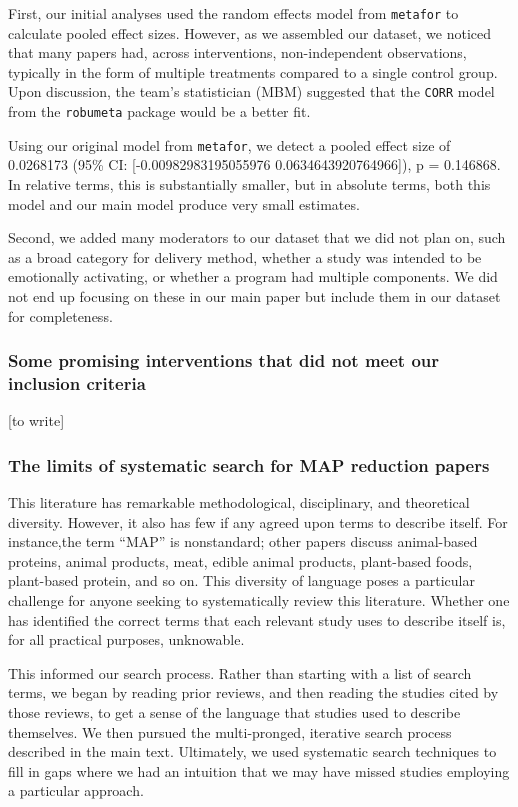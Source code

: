 \documentclass[sn-nature,referee,pdflatex]{sn-jnl}
\begin{document}
First, our initial analyses used the random effects model from
\texttt{metafor} to calculate pooled effect sizes. However, as we
assembled our dataset, we noticed that many papers had, across
interventions, non-independent observations, typically in the form of
multiple treatments compared to a single control group. Upon discussion,
the team's statistician (MBM) suggested that the \texttt{CORR} model
from the \texttt{robumeta} package would be a better fit.

Using our original model from \texttt{metafor}, we detect a pooled
effect size of 0.0268173 (95\% CI: {[}-0.00982983195055976
0.0634643920764966{]}), p = 0.146868. In relative terms, this is
substantially smaller, but in absolute terms, both this model and our
main model produce very small estimates.

Second, we added many moderators to our dataset that we did not plan on,
such as a broad category for delivery method, whether a study was
intended to be emotionally activating, or whether a program had multiple
components. We did not end up focusing on these in our main paper but
include them in our dataset for completeness.

\subsubsection{Some promising interventions that did not meet our
inclusion
criteria}\label{some-promising-interventions-that-did-not-meet-our-inclusion-criteria}

{[}to write{]}

\subsubsection{The limits of systematic search for MAP reduction
papers}\label{sec5.4.1}

This literature has remarkable methodological, disciplinary, and
theoretical diversity. However, it also has few if any agreed upon terms
to describe itself. For instance,the term ``MAP'' is nonstandard; other
papers discuss animal-based proteins, animal products, meat, edible
animal products, plant-based foods, plant-based protein, and so on. This
diversity of language poses a particular challenge for anyone seeking to
systematically review this literature. Whether one has identified the
correct terms that each relevant study uses to describe itself is, for
all practical purposes, unknowable.

This informed our search process. Rather than starting with a list of
search terms, we began by reading prior reviews, and then reading the
studies cited by those reviews, to get a sense of the language that
studies used to describe themselves. We then pursued the multi-pronged,
iterative search process described in the main text. Ultimately, we used
systematic search techniques to fill in gaps where we had an intuition
that we may have missed studies employing a particular approach.
\end{document}
